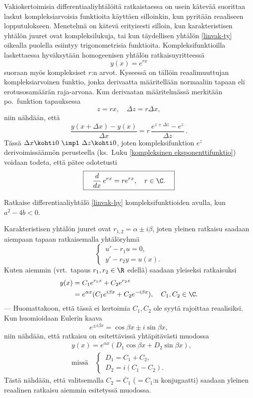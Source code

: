 Vakiokertoimisia differentiaaliyhtälöitä ratkaistaessa on usein kätevää suorittaa laskut 
kompleksiarvoisia funktioita käyttäen silloinkin, kun pyritään reaaliseen lopputulokseen.
Menetelmä on kätevä erityisesti silloin, kun karakteristisen yhtälön juuret ovat 
kompleksilukuja, tai kun täydellisen yhtälön \eqref{linvak-ty} oikealla puolella esiintyy
trigonometrisia funktioita. Kompleksifunktioilla laskettaessa hyväksytään homogeenisen yhtälön
ratkaisuyritteessä
\[
y(x)=e^{rx}
\]
suoraan myös kompleksiset $r$:n arvot. Kyseessä on tällöin reaalimuuttujan kompleksiarvoinen
funktio, jonka derivaatta määritellään normaaliin tapaan eli erotusosamäärän raja-arvona. Kun
derivaatan määritelmässä merkitään po.\ funktion tapauksessa
\[
z=rx,\quad \Delta z=r\Delta x,
\]
niin nähdään, että
\[
\frac{y(x+\Delta x)-y(x)}{\Delta x}=r\,\frac{e^{z+\Delta z}-e^z}{\Delta z}\,.
\]
Tässä $\Delta x\kohti 0 \ \impl \ \Delta z\kohti 0$, joten kompleksifunktion $e^z$ 
derivoimissäännön perusteella (ks.\ Luku \ref{kompleksinen eksponenttifunktio}) voidaan todeta,
että pätee odotetusti
\[
\boxed{\quad \frac{d}{dx}\,e^{rx}=re^{rx},\quad r\in\C. \quad}
\]
\begin{Exa} Ratkaise differentiaaliyhtälö \eqref{linvak-hy} kompleksifunktioiden avulla, kun
$a^2-4b<0$.
\end{Exa}
\ratk Karakteristisen yhtälön juuret ovat $r_{1,2}=\alpha \pm i\beta$, joten yleinen ratkaisu
saadaan aiempaan tapaan ratkaisemalla yhtälöryhmä
\[
\begin{cases}
\,u'-r_1u=0, \\ \,y'-r_2y=u(x).
\end{cases}
\]
Kuten aiemmin (vrt.\ tapaus $r_1,r_2\in\R$ edellä) saadaan yleiseksi ratkaisuksi
\begin{align*}
y(x) &= C_1e^{r_1 x}+C_2e^{r_2 x} \\
     &= e^{\alpha x}(C_1e^{i\beta x}+C_2e^{-i\beta x}),\quad C_1,C_2\in\C.
\end{align*}
--- Huomattakoon, että tässä ei kertoimia $C_1,C_2$ ole syytä rajoittaa reaalisiksi. Kun
huomioidaan Eulerin kaava
\[
e^{\pm i\beta x}=\cos\beta x\pm i\sin \beta x,
\]
niin nähdään, että ratkaisu on esitettävissä yhtäpitävästi muodossa
\begin{align*}
&y(x)=e^{\alpha x}(D_1\cos\beta x+D_2\sin\beta x), \\[1mm]
&\text{missä} \quad
\begin{cases} \,D_1 = C_1+C_2, \\ \,D_2 =i(C_1-C_2). \end{cases}
\end{align*}
Tästä nähdään, että valitsemalla $C_2=\overline{C}_1$ ($= C_1$:n konjugaatti) saadaan yleinen
reaalinen ratkaisu aiemmin esitetyssä muodossa. \loppu

